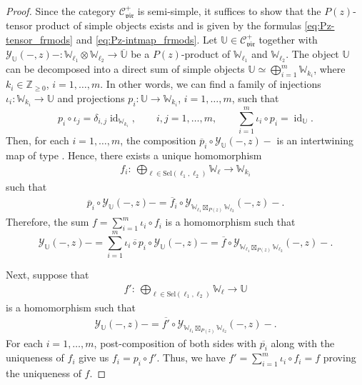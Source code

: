 \documentclass[10pt,a4paper]{amsart}
\numberwithin{equation}{section}
\newcommand{\ol}[1]{\overline{#1}}
\newcommand{\id}{\operatorname{id}}
\newcommand{\bZ}{\mathbb{Z}}
\newcommand{\cC}{\mathcal{C}}
\newcommand{\catVir}{\cC_{\vir}}
\newcommand{\Sel}{\mathrm{Sel}}
\newcommand{\voaint}{\mathcal{Y}}
\newcommand{\inttyp}[3]{\binom{#3}{#1 #2}}
\newcommand{\virmod}{\mathbb{W}}
\newcommand{\virmodgen}{\mathbb{U}}
\newcommand{\vir}{\mathfrak{vir}}
\begin{document}
\begin{proof}
Since the category $\catVir^{+}$ is semi-simple, it suffices to show that the $P(z)$-tensor product of simple objects exists and is given by the formulas \eqref{eq:Pz-tensor_frmods} and \eqref{eq:Pz-intmap_frmods}.
Let $\virmodgen\in \catVir^{+}$ together with $\voaint_{\virmodgen} (-,z)-\colon \virmod_{\ell_{1}}\otimes\virmod_{\ell_{2}}\to\ol{\virmodgen}$ be a $P(z)$-product of $\virmod_{\ell_{1}}$ and $\virmod_{\ell_{2}}$.
The object $\virmodgen$ can be decomposed into a direct sum of simple objects
$
 \virmodgen\simeq \bigoplus_{i=1}^{m}\virmod_{k_{i}}$,
where $k_{i}\in\bZ_{\geq 0}$, $i=1,\dots, m$.
In other words, we can find a family of injections $\iota_{i}\colon \virmod_{k_{i}}\to \virmodgen$ and projections $p_{i}\colon \virmodgen\to\virmod_{k_{i}}$, $i=1,\dots, m$, such that
\[%
 p_{i}\circ \iota_{j}=\delta_{i,j}\id_{\virmod_{k_{i}}},\qquad i,j=1,\dots,m,\qquad \sum_{i=1}^{m}\iota_{i}\circ p_{i}=\id_{\virmodgen}.
\]
Then, for each $i=1,\dots, m$, the composition
$\ol{p}_{i}\circ \voaint_{\virmodgen}(-,z)-$
is an intertwining map of type \smash{$\inttyp{\virmod_{\ell_{1}}}{\virmod_{\ell_{2}}}{\virmod_{k_{i}}}$}.
Hence, there exists a unique homomorphism
\begin{gather*}
 f_{i}\colon\ \bigoplus_{\ell\in\Sel(\ell_{1},\ell_{2})}\virmod_{\ell}\to\virmod_{k_{i}}
\end{gather*}
such that
\begin{gather*}
 \ol{p}_{i}\circ \voaint_{\virmodgen}(-,z)-=\ol{f}_{i}\circ \voaint_{\virmod_{\ell_{1}}\boxtimes_{P(z)}\virmod_{\ell_{2}}}(-,z)-.
\end{gather*}
Therefore, the sum $f=\sum_{i=1}^{m}\iota_{i}\circ f_{i}$ is a homomorphism such that
\[%
 \voaint_{\virmodgen}(-,z)-=\sum_{i=1}^{m}\ol{\iota_{i}\circ p_{i}}\circ \voaint_{\virmodgen}(-,z)-=\ol{f}\circ \voaint_{\virmod_{\ell_{1}}\boxtimes_{P(z)}\virmod_{\ell_{2}}}(-,z)-.
\]

Next, suppose that
\begin{gather*}
	f' \colon\ \bigoplus_{\ell\in\Sel(\ell_{1},\ell_{2})}\virmod_{\ell}\to \virmodgen
\end{gather*}
is a homomorphism such that
\begin{gather*}
	\voaint_{\virmodgen}(-,z)-=\ol{f'}\circ \voaint_{\virmod_{\ell_{1}}\boxtimes_{P(z)}\virmod_{\ell_{2}}}(-,z)-.
\end{gather*}
For each $i=1,\dots, m$, post-composition of both sides with $\ol{p_{i}}$ along with the uniqueness of $f_{i}$
give us $f_{i} = p_{i}\circ f'$. Thus, we have
$
	f' = \sum_{i=1}^{m}\iota_{i}\circ f_{i} = f
$
proving the uniqueness of $f$.
\end{proof}
\end{document}
